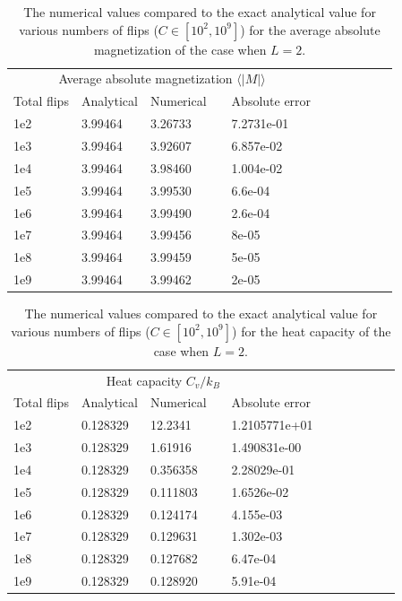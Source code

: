 \documentclass[norsk,a4paper,12pt]{article}
\begin{document}
\begin{table}[H]
\centering
\caption{The numerical values compared to the exact analytical value for various numbers of flips ($C\in[10^2,10^9]$) for the average absolute magnetization of the case when $L=2$.}
\label{tab:benchmark2} 
\begin{tabularx}{\textwidth}{XlXrXrXrXrX}
&&&&\\
\toprule
\multicolumn{5}{c}{Average absolute magnetization $\langle |M|\rangle$}\\
\cline{2-3}
Total flips  & Analytical  & Numerical && Absolute error\\
\midrule
1e2 & 3.99464  & 3.26733  && 7.2731e-01\\
1e3 & 3.99464  & 3.92607  && 6.857e-02\\
1e4 & 3.99464  & 3.98460  && 1.004e-02\\
1e5 & 3.99464  & 3.99530  && 6.6e-04\\
1e6 & 3.99464  & 3.99490  && 2.6e-04\\
1e7 & 3.99464  & 3.99456  && 8e-05\\
1e8 & 3.99464  & 3.99459  && 5e-05\\
1e9 & 3.99464  & 3.99462  && 2e-05\\
\bottomrule
\end{tabularx}
\end{table}
\begin{table}[H]
\centering
\caption{The numerical values compared to the exact analytical value for various numbers of flips ($C\in[10^2,10^9]$) for the heat capacity of the case when $L=2$.}
\label{tab:benchmark3} 
\begin{tabularx}{\textwidth}{XlXrXrXrXrX}
&&&&\\
\toprule
\multicolumn{5}{c}{Heat capacity $C_v/k_B$}\\
\cline{2-3}
Total flips  & Analytical  & Numerical && Absolute error\\
\midrule
1e2   & 0.128329  & 12.2341   && 1.2105771e+01\\
1e3   & 0.128329  & 1.61916   && 1.490831e-00\\
1e4   & 0.128329  & 0.356358  && 2.28029e-01\\
1e5   & 0.128329  & 0.111803  && 1.6526e-02\\
1e6   & 0.128329  & 0.124174  && 4.155e-03\\
1e7 	  & 0.128329  & 0.129631  && 1.302e-03\\
1e8   & 0.128329  & 0.127682  && 6.47e-04\\
1e9   & 0.128329  & 0.128920  && 5.91e-04\\
\bottomrule
\end{tabularx}
\end{table}
\end{document}
